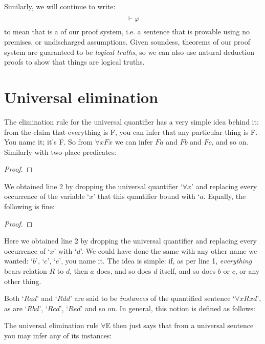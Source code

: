 Similarly, we will continue to write:
$${} \vdash \mathcal{\varphi}$$
to mean that \meta{\varphi} is a  of our proof system, i.e. a sentence that is provable using no premises, or undischarged assumptions.  Given soundess, theorems of our proof system are guaranteed to be \emph{logical truths}, so we can also use natural deduction proofs to show that things are logical truths.



\section{Universal elimination}\label{s:UniversalElim}


The elimination rule for the universal quantifier has a very simple idea behind it: from the claim that everything is F, you can infer that any particular thing is F. You name it; it's F.  So from $\forall xFx$ we can infer $Fa$ and $Fb$ and $Fc$, and so on.  Similarly with two-place predicates:
\begin{proof}
	 
\end{proof}
We obtained line 2 by dropping the universal quantifier `$\forall x$' and replacing every occurrence of the variable `$x$' that this quantifier bound with `$a$. Equally, the following is fine:
\begin{proof}
	 
\end{proof}
Here we obtained line 2 by dropping the universal quantifier and replacing every occurrence of `$x$' with `$d$'. We could have done the same with any other name we wanted: `$b$', `$c$', `$e$', you name it.  The idea is simple: if, as per line 1, \emph{everything} bears relation $R$ to $d$, then $a$ does, and so does $d$ itself, and so does $b$ or $c$, or any other thing.

Both `$Rad$' and `$Rdd$' are said to be \emph{instances} of the quantified sentence `$\forall xRxd$', as are `$Rbd$', `$Rcd$', `$Red$' and so on.  In general, this notion is defined as follows:

The universal elimination rule $\forall$E then just says that from a universal sentence you may infer any of its instances:

